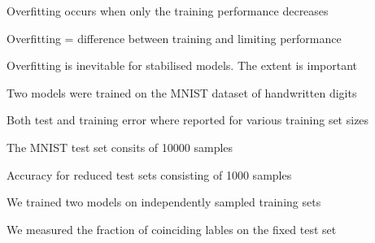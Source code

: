 \documentclass[landscape,footrule]{foils}
\begin{document}


\begin{triangles}
\item Overfitting occurs when only the training performance decreases
\item Overfitting = difference between training and limiting performance
\item Overfitting is inevitable for stabilised models. The extent is important
\end{triangles}




\enlargethispage{1cm}
\vspace{-3ex}
\begin{triangles}
\item Two models were trained on the MNIST dataset of handwritten digits
\item Both test and training error where reported for various training set sizes
\end{triangles}


\enlargethispage{1cm}
\vspace{-3ex}
\begin{triangles}
\item The MNIST test set consits of 10000 samples 
\item Accuracy for reduced test sets consisting of 1000 samples
\end{triangles}


\enlargethispage{1cm}
\vspace{2ex}
\begin{triangles}
\item We trained two models on independently sampled training sets
\item We measured the fraction of coinciding lables on the fixed test set
\end{triangles}



\end{document}
